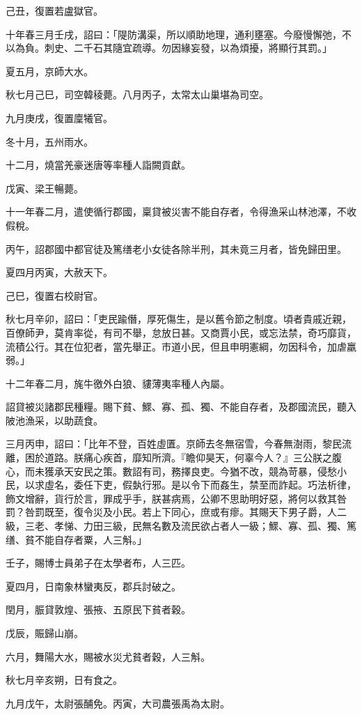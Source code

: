 \begin{pinyinscope}
己丑，復置若盧獄官。

十年春三月壬戌，詔曰：「隄防溝渠，所以順助地理，通利壅塞。今廢慢懈弛，不以為負。刺史、二千石其隨宜疏導。勿因緣妄發，以為煩擾，將顯行其罰。」

夏五月，京師大水。

秋七月己巳，司空韓稜薨。八月丙子，太常太山巢堪為司空。

九月庚戌，復置廩犧官。

冬十月，五州雨水。

十二月，燒當羌豪迷唐等率種人詣闕貢獻。

戊寅、梁王暢薨。

十一年春二月，遣使循行郡國，稟貸被災害不能自存者，令得漁采山林池澤，不收假稅。

丙午，詔郡國中都官徒及篤缮老小女徒各除半刑，其未竟三月者，皆免歸田里。

夏四月丙寅，大赦天下。

己巳，復置右校尉官。

秋七月辛卯，詔曰：「吏民踰僭，厚死傷生，是以舊令節之制度。頃者貴戚近親，百僚師尹，莫肯率從，有司不舉，怠放日甚。又商賈小民，或忘法禁，奇巧靡貨，流積公行。其在位犯者，當先舉正。巿道小民，但且申明憲綱，勿因科令，加虐羸弱。」

十二年春二月，旄牛徼外白狼、貗薄夷率種人內屬。

詔貸被災諸郡民種糧。賜下貧、鰥、寡、孤、獨、不能自存者，及郡國流民，聽入陂池漁采，以助蔬食。

三月丙申，詔曰：「比年不登，百姓虛匱。京師去冬無宿雪，今春無澍雨，黎民流離，困於道路。朕痛心疾首，靡知所濟。『瞻仰昊天，何辜今人？』三公朕之腹心，而未獲承天安民之策。數詔有司，務擇良吏。今猶不改，競為苛暴，侵愁小民，以求虛名，委任下吏，假埶行邪。是以令下而姦生，禁至而詐起。巧法析律，飾文增辭，貨行於言，罪成乎手，朕甚病焉，公卿不思助明好惡，將何以救其咎罰？咎罰既至，復令災及小民。若上下同心，庶或有瘳。其賜天下男子爵，人二級，三老、孝悌、力田三級，民無名數及流民欲占者人一級；鰥、寡、孤、獨、篤缮、貧不能自存者粟，人三斛。」

壬子，賜博士員弟子在太學者布，人三匹。

夏四月，日南象林蠻夷反，郡兵討破之。

閏月，脤貸敦煌、張掖、五原民下貧者穀。

戊辰，賑歸山崩。

六月，舞陽大水，賜被水災尤貧者穀，人三斛。

秋七月辛亥朔，日有食之。

九月戊午，太尉張酺免。丙寅，大司農張禹為太尉。


\end{pinyinscope}
